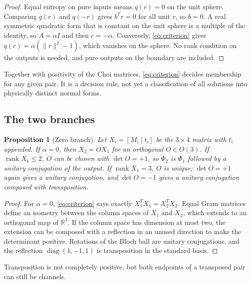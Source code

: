 \documentclass[12pt,a4paper]{article}
\newtheorem{proposition}[theorem]{Proposition}
\begin{document}
\begin{proof}
Equal entropy on pure inputs means $q(r)=0$ on the unit sphere. Comparing $q(r)$ and $q(-r)$ gives $b^Tr=0$ for all unit $r$, so $b=0$. A real symmetric quadratic form that is constant on the unit sphere is a multiple of the identity, so $A=\alpha I$ and then $c=-\alpha$. Conversely, \eqref{eq:criterion} gives $q(r)=\alpha(\|r\|^2-1)$, which vanishes on the sphere. No rank condition on the outputs is needed, and pure outputs on the boundary are included.
\end{proof}

Together with positivity of the Choi matrices, \eqref{eq:criterion} decides membership for any given pair. It is a decision rule, not yet a classification of all solutions into physically distinct normal forms.

\subsection{The two branches}

\begin{proposition}[Zero branch]
\label{prop:zero}
Let $X_i=[M_i\mid t_i]$ be the $3\times4$ matrix with $t_i$ appended. If $\alpha=0$, then $X_2=OX_1$ for an orthogonal $O\in O(3)$. If $\operatorname{rank}X_1\le2$, $O$ can be chosen with $\det O=+1$, so $\Phi_2$ is $\Phi_1$ followed by a unitary conjugation of the output. If $\operatorname{rank}X_1=3$, $O$ is unique; $\det O=+1$ again gives a unitary conjugation, and $\det O=-1$ gives a unitary conjugation composed with transposition.
\end{proposition}

\begin{proof}
For $\alpha=0$, \eqref{eq:criterion} says exactly $X_1^TX_1=X_2^TX_2$. Equal Gram matrices define an isometry between the column spaces of $X_1$ and $X_2$, which extends to an orthogonal map of $\mathbb R^3$. If the column space has dimension at most two, the extension can be composed with a reflection in an unused direction to make the determinant positive. Rotations of the Bloch ball are unitary conjugations, and the reflection $\operatorname{diag}(1,-1,1)$ is transposition in the standard basis.
\end{proof}

Transposition is not completely positive, but both endpoints of a transposed pair can still be channels.
\end{document}
